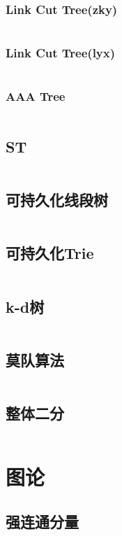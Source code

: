 \documentclass[a4paper]{article}
\newcommand{\cppcode}[1]{
    \inputminted[mathescape,
    frame=lines,linenos]{cpp}{source/#1}
}
\begin{document}
\subsubsection{Link Cut Tree(zky)}
\cppcode{data-structure/LCT.cpp}

\subsubsection{Link Cut Tree(lyx)}
\cppcode{data-structure/Link-cut-tree.cpp}

\subsubsection{AAA Tree}
\cppcode{data-structure/toptree.cpp}

\subsection{ST}
\cppcode{data-structure/Rmq.cpp}

\subsection{可持久化线段树}
\cppcode{data-structure/ChairTree.cpp}

\subsection{可持久化Trie}
\cppcode{data-structure/ChairTrie.cpp}

\subsection{k-d树}
\cppcode{data-structure/kd-tree.cpp}


\subsection{莫队算法}
\cppcode{data-structure/mo-team.cpp}

\subsection{整体二分}
\cppcode{data-structure/binary-search.cpp}

\section{图论}

\subsection{强连通分量}
\end{document}
